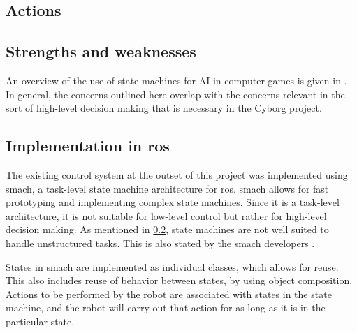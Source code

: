 \documentclass[\rootfolder/main.tex]{subfiles}
\begin{document}
\subsection{Actions}



\subsection{Strengths and weaknesses}
\label{sec:state_machine_strength_weaknesses}

An overview of the use of state machines for AI in computer games is given in \cite{Millington2009}.
In general, the concerns outlined here overlap with the concerns relevant in the sort of high-level decision making that is necessary in the Cyborg project.



\subsection{Implementation in \acrshort{ros}}

The existing control system at the outset of this project was implemented using \acrshort{smach}, a task-level state machine architecture for \acrshort{ros}.
\acrshort{smach} allows for fast prototyping and implementing complex state machines.
Since it is a task-level architecture, it is not suitable for low-level control but rather for high-level decision making.
As mentioned in \cref{sec:state_machine_strength_weaknesses}, state machines are not well suited to handle unstructured tasks.
This is also stated by the \acrshort{smach} developers \cite{Bohren}.

States in \acrshort{smach} are implemented as individual classes, which allows for reuse.
This also includes reuse of behavior between states, by using object composition.
Actions to be performed by the robot are associated with states in the state machine, and the robot will carry out that action for as long as it is in the particular state.
\end{document}

